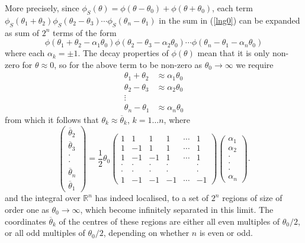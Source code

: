 \documentclass[11pt]{article}
\newcommand\RR{{\mathbb R}}
\newcommand\beq{\begin{equation}}
\newcommand\eeq{\end{equation}}
\newcommand\nn{\nonumber}
\newcommand\half{{\textstyle\frac{1}{2}}}
\newcommand{\te}{\theta}
\newcommand{\tz}{\theta_0}
\begin{document}
More precisely, since
$\phi_S(\theta)=\phi(\theta{-}\tz)+\phi(\theta{+}\tz)$, each term
$\phi_S(\theta_1+\theta_2)\phi_S(\theta_2-\theta_3)\cdots
\phi_S(\theta_n-\theta_1)$
in the sum in (\ref{lng0}) can be expanded as sum of $2^n$
terms of the form
\beq
\phi(\te_1+\te_2-\alpha_1\tz)\phi(\te_2-\te_3-\alpha_2\tz)\cdots
\phi(\te_n-\te_1-\alpha_n\tz)
\eeq
where each $\alpha_k=\pm1$. The decay properties of $\phi(\te)$ mean that
it is only non-zero for $\te\approx0$, so for the above term to be
non-zero as $\tz\to\infty$ we require
\begin{align}
 \te_1+\te_2&\approx\alpha_1\tz\nn\\
\te_2-\te_3&\approx\alpha_2\tz\nn\\[2pt]
\vdots&\nn\\[4pt]
\te_n-\te_1&\approx\alpha_n\tz
\end{align}
from which it follows that $\te_k\approx\overline\te_k$, $k=1\dots n$,
where
\begin{equation}
 \left(\begin{array}{c}
\overline\te_2\\
\overline\te_3\\\cdot\\\cdot\\\overline\te_n\\\overline\te_1
 \end{array}\right)
=
\half\tz\left(\begin{array}{cccccc}
1&1&1&1&\cdots&1\\
1&-1&1&1&\cdots&1\\
1&-1&-1&1&\cdots&1\\
\cdot&\cdot&\cdot&\cdot&&\cdot\\
\cdot&\cdot&\cdot&\cdot&&\cdot\\
1&-1&-1&-1&\cdots&-1
\end{array}\right)
\left(\begin{array}{c}
\alpha_1\\
\alpha_2\\
\cdot\\
\cdot\\
\cdot\\
\alpha_n
\end{array}
\right).
\label{matrix}
\end{equation}
and the integral over $\RR^n$ has indeed localised, to a set of $2^n$
regions of size of order one as $\tz\to\infty$, which become
infinitely separated in this limit.
The coordinates $\overline\te_k$ of the
centres of these regions are either all even multiples
of $\tz/2$, or all odd multiples of $\tz/2$, depending on whether $n$
is even or odd.
\end{document}
